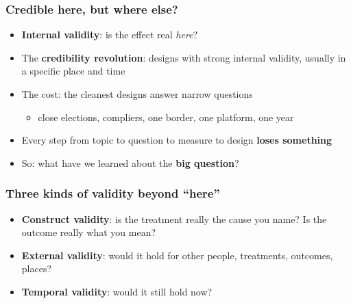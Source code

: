 \begin{frame}
\frametitle{Credible here, but where else?}
\centering

\begin{itemize}
  \item \textbf{Internal validity}: is the effect real \textit{here}?
  \vspace{8pt}
  \item The \textbf{credibility revolution}: designs with strong internal validity, usually in a specific place and time
  \vspace{8pt}
  \item<2-> The cost: the cleanest designs answer narrow questions
  \begin{itemize}
    \item close elections, compliers, one border, one platform, one year
  \end{itemize}
  \vspace{8pt}
  \item<3-> Every step from topic to question to measure to design \textbf{loses something}
  \vspace{8pt}
  \item<4-> So: what have we learned about the \textbf{big question}?
\end{itemize}

\end{frame}

\begin{frame}
\frametitle{Three kinds of validity beyond ``here''}
\centering

\begin{itemize}
  \item \textbf{Construct validity}: is the treatment really the cause you name? Is the outcome really what you mean?
  \vspace{10pt}
  \item \textbf{External validity}: would it hold for other people, treatments, outcomes, places?
  \vspace{10pt}
  \item \textbf{Temporal validity}: would it still hold now?
\end{itemize}

\end{frame}

